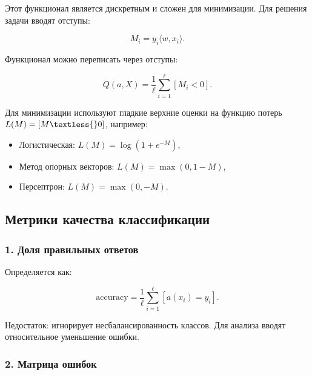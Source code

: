 Этот функционал является дискретным и сложен для минимизации. Для
решения задачи вводят отступы:

\begin{equation}
M_i = y_i \langle w, x_i \rangle.
\end{equation}

Функционал можно переписать через отступы:

\begin{equation}
Q(a, X) = \frac{1}{\ell} \sum_{i=1}^\ell [M_i < 0].
\end{equation}

Для минимизации используют гладкие верхние оценки на функцию
потерь \(L(M) = {[}M \textless{} 0{]} \), например: 
\begin{itemize}
\item
Логистическая:
\(L(M) = \log(1 + e^{-M})\),
\item
Метод опорных векторов:
\(L(M) = \max(0, 1 - M)\), 
\item
Персептрон: \(L(M) = \max(0, -M)\).
\end{itemize}
\hypertarget{ux43cux435ux442ux440ux438ux43aux438-ux43aux430ux447ux435ux441ux442ux432ux430-ux43aux43bux430ux441ux441ux438ux444ux438ux43aux430ux446ux438ux438}{%
\subsection*{Метрики качества
классификации}\label{ux43cux435ux442ux440ux438ux43aux438-ux43aux430ux447ux435ux441ux442ux432ux430-ux43aux43bux430ux441ux441ux438ux444ux438ux43aux430ux446ux438ux438}}

\hypertarget{ux434ux43eux43bux44f-ux43fux440ux430ux432ux438ux43bux44cux43dux44bux445-ux43eux442ux432ux435ux442ux43eux432}{%
\subsubsection*{1. Доля правильных
ответов}\label{ux434ux43eux43bux44f-ux43fux440ux430ux432ux438ux43bux44cux43dux44bux445-ux43eux442ux432ux435ux442ux43eux432}}

Определяется как:

\begin{equation}
\text{accuracy} = \frac{1}{\ell} \sum_{i=1}^\ell [a(x_i) = y_i].
\end{equation}

Недостаток: игнорирует несбалансированность классов. Для анализа вводят
относительное уменьшение ошибки.

\hypertarget{ux43cux430ux442ux440ux438ux446ux430-ux43eux448ux438ux431ux43eux43a}{%
\subsubsection*{2. Матрица
ошибок}\label{ux43cux430ux442ux440ux438ux446ux430-ux43eux448ux438ux431ux43eux43a}}

